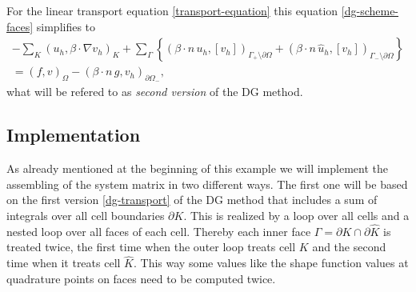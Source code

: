 \documentclass[11pt]{article}
\begin{document}
For the linear transport equation \eqref{transport-equation} this
equation \eqref{dg-scheme-faces} simplifies to
\begin{multline}\label{dg-transport-gamma}
  -\sum_K(u_h,\beta\cdot\nabla v_h)_K+\sum_\Gamma\left\{(\beta\cdot n\, u_h, [v_h])_{\Gamma_+\setminus\partial\Omega}+(\beta\cdot n\, \hat u_h, [v_h])_{\Gamma_-\setminus\partial\Omega}\right\}\\
=(f,v)_\Omega-(\beta\cdot n\, g, v_h)_{\partial\Omega_-},
\end{multline}
what will be refered to as \emph{second version} of the DG method.
\subsection{Implementation}
As already mentioned at the beginning of this example we will
implement the assembling of the system matrix in two different ways.
The first one will be based on the first version \eqref{dg-transport}
of the DG method that includes a sum of integrals over all cell
boundaries $\partial K$. This is realized by a loop over all cells and
a nested loop over all faces of each cell.  Thereby each inner face
$\Gamma=\partial K\cap\partial \hat K$ is treated twice, the first
time when the outer loop treats cell $K$ and the second time when it
treats cell $\hat K$. This way some values like the shape function
values at quadrature points on faces need to be computed twice.
\end{document}

